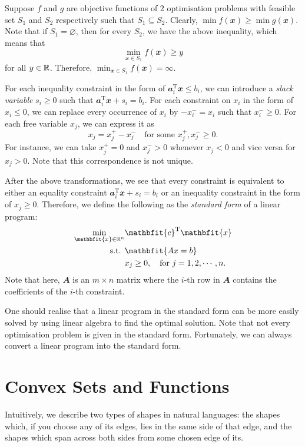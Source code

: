 \documentclass[math, code]{amznotes}
\theoremstyle{remark}
\begin{document}
Suppose $f$ and $g$ are objective functions of $2$ optimisation problems with feasible set $S_1$ and $S_2$ respectively such that $S_1 \subseteq S_2$. Clearly, $\min f(\mathbfit{x}) \geq \min g(\mathbfit{x})$. Note that if $S_1 = \varnothing$, then for every $S_2$, we have the above inequality, which means that
\begin{equation*}
    \min_{\mathbfit{x} \in S_1} f(\mathbfit{x}) \geq y
\end{equation*}
for all $y \in \mathbb{R}$. Therefore, $\min_{\mathbfit{x} \in S_1} f(\mathbfit{x}) = \infty$.

For each inequality constraint in the form of $\mathbfit{a}_i^{\mathrm{T}}\mathbfit{x} \leq b_i$, we can introduce a \textit{slack variable} $s_i \geq 0$ such that $\mathbfit{a}_i^{\mathrm{T}}\mathbfit{x} + s_i = b_i$. For each constraint on $x_i$ in the form of $x_i \leq 0$, we can replace every occurrence of $x_i$ by $-x_i^- = x_i$ such that $x_i^- \geq 0$. For each free variable $x_j$, we can express it as 
\begin{equation*}
    x_j = x_j^+ - x_j^- \quad \textrm{for some } x_j^+, x_j^- \geq 0.
\end{equation*}
For instance, we can take $x_j^+ = 0$ and $x_j^- > 0$ whenever $x_j < 0$ and vice versa for $x_j > 0$. Note that this correspondence is not unique.

After the above transformations, we see that every constraint is equivalent to either an equality constraint $\mathbfit{a}_i^{\mathrm{T}}\mathbfit{x} + s_i = b_i$ or an inequality constraint in the form of $x_j \geq 0$. Therefore, we define the following as the \textit{standard form} of a linear program:
\begin{align*}
    \min_{\mathbfit{x} \in \R^n} & \mathbfit{c}^{\mathrm{T}}\mathbfit{x} \\
    \textrm{s.t. } & \mathbfit{Ax = b} \\
    & x_j \geq 0, \quad \textrm{for } j = 1, 2, \cdots, n.
\end{align*}
Note that here, $\mathbfit{A}$ is an $m \times n$ matrix where the $i$-th row in $\mathbfit{A}$ contains the coefficients of the $i$-th constraint.

One should realise that a linear program in the standard form can be more easily solved by using linear algebra to find the optimal solution. Note that not every optimisation problem is given in the standard form. Fortunately, we can always convert a linear program into the standard form.
\section{Convex Sets and Functions}
Intuitively, we describe two types of shapes in natural languages: the shapes which, if you choose any of its edges, lies in the same side of that edge, and the shapes which span across both sides from some chosen edge of its.
\end{document}
